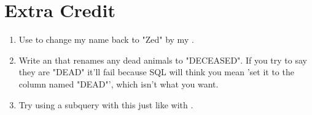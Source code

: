 \section{Extra Credit}

\begin{enumerate}
\item Use  to change my name back to "Zed" by my .
\item Write an  that renames any dead animals to "DECEASED".  If you try to say they are "DEAD" it'll fail because SQL will think you mean 'set it to the column named "DEAD"', which isn't what you want.
\item Try using a subquery with this just like with .
\end{enumerate}



